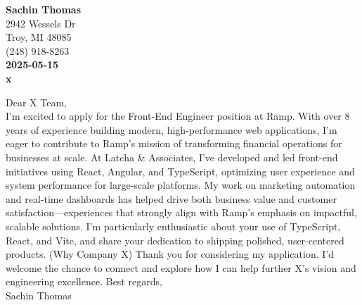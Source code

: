 
\noindent \textbf{Sachin Thomas} \\
2942 Wessels Dr \\
Troy, MI 48085 \\
(248) 918-8263 \\
\vspace{8pt}
\noindent \textbf{2025-05-15} \\
\vspace{4pt}
\noindent \textbf{x}
\newline

\noindent Dear X Team, \\

\noindent I'm excited to apply for the Front-End Engineer position at Ramp. With over 8 years of experience building modern, high-performance web applications, I'm eager to contribute to Ramp's mission of transforming financial operations for businesses at scale.
\newline\newline
\noindent At Latcha \& Associates, I've developed and led front-end initiatives using React, Angular, and TypeScript, optimizing user experience and system performance for large-scale platforms. My work on marketing automation and real-time dashboards has helped drive both business value and customer satisfaction—experiences that strongly align with Ramp's emphasis on impactful, scalable solutions. I'm particularly enthusiastic about your use of TypeScript, React, and Vite, and share your dedication to shipping polished, user-centered products.
\newline\newline
\noindent (Why Company X)
\newline\newline
Thank you for considering my application. I'd welcome the chance to connect and explore how I can help further X's vision and engineering excellence.
\newline\newline
\noindent Best regards,\\
\noindent Sachin Thomas

